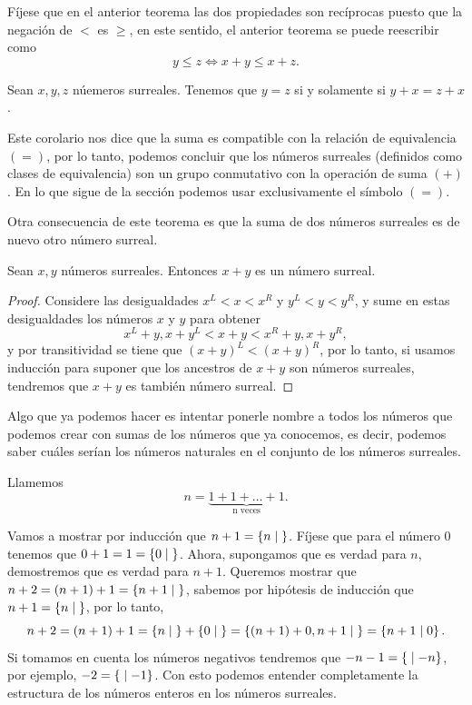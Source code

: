     F\'ijese que en el anterior teorema las dos propiedades son rec\'iprocas puesto que la negaci\'on de $<$ es $\ge$, en este sentido, el anterior teorema se puede reescribir como 
    \[
        y \le z \Leftrightarrow x+y\le x+z.
    \]

    \begin{corollary}
        Sean $x, y, z$ n\'uemeros surreales. Tenemos que $y=z$ si y solamente si $y+x=z+x$.
    \end{corollary}

    Este corolario nos dice que la suma es compatible con la relaci\'on de equivalencia $(=)$, por lo tanto, podemos concluir que los n\'umeros surreales (definidos como clases de equivalencia) son un grupo conmutativo con la operaci\'on de suma $(+)$. En lo que sigue de la secci\'on podemos usar exclusivamente el s\'imbolo $(=)$.

    Otra consecuencia de este teorema es que la suma de dos n\'umeros surreales es de nuevo otro n\'umero surreal.

    \begin{corollary}
        Sean $x, y$ n\'umeros surreales. Entonces $x + y$ es un n\'umero surreal.
    \end{corollary}

    \begin{proof}
        Considere las desigualdades $x^L < x < x^R$ y $y^L < y < y^R$, y sume en estas desigualdades los n\'umeros $x$ y $y$ para obtener
        \[
            x^L + y, x + y^L < x+y < x^R + y, x + y^R,
        \]
        y por transitividad se tiene que $(x+y)^L < (x+y)^R$, por lo tanto, si usamos inducci\'on para suponer que los ancestros de $x+y$ son n\'umeros surreales, tendremos que $x+y$ es tambi\'en n\'umero surreal.
    \end{proof}
    
    Algo que ya podemos hacer es intentar ponerle nombre a todos los n\'umeros que podemos crear con sumas de los n\'umeros que ya conocemos, es decir, podemos saber cu\'ales ser\'ian los n\'umeros naturales en el conjunto de los n\'umeros surreales.

    \begin{example}
        Llamemos 
        \[
            n = \underbrace{1+1+\dots+1}_{\text{n veces}}.
        \]

        Vamos a mostrar por inducci\'on que $n+1 = \left\{n\;\middle|\; \right\}$. F\'ijese que para el n\'umero $0$ tenemos que $0+1 = 1 = \left\{0\;\middle|\; \right\}$. Ahora, supongamos que es verdad para $n$, demostremos que es verdad para $n+1$. Queremos mostrar que $n+2 = (n+1)+1 = \left\{n+1\;\middle|\; \right\}$, sabemos por hip\'otesis de inducci\'on que $n+1 = \left\{n\;\middle|\; \right\}$, por lo tanto,
        \[
            n+2 = (n+1)+1 = \left\{n\;\middle|\; \right\} + \left\{0\;\middle|\; \right\} = \left\{(n+1)+0, n+1\;\middle|\; \right\} = \left\{n+1\;\middle|\; 0\right\}.
        \]
        Si tomamos en cuenta los n\'umeros negativos tendremos que $-n-1 = \left\{\;\middle|\; -n\right\}$, por ejemplo, $-2=\left\{\;\middle|\; -1\right\}$. Con esto podemos entender completamente la estructura de los n\'umeros enteros en los n\'umeros surreales.
    \end{example}

